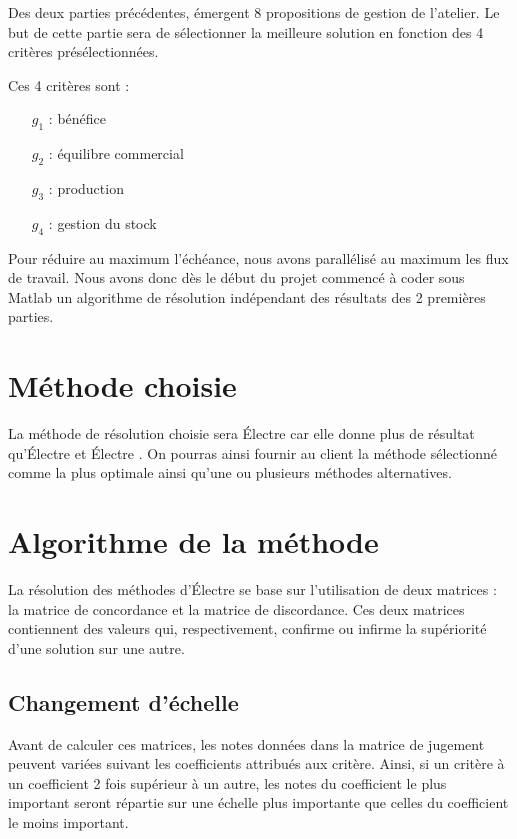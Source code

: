 
Des deux parties précédentes, émergent 8 propositions de gestion de l'atelier.
Le but de cette partie sera de sélectionner la meilleure solution en fonction des 4 critères présélectionnées.

Ces 4 critères sont :
\begin{itemize}
\item[$g_1$] : bénéfice
\item[$g_2$] : équilibre commercial
\item[$g_3$] : production
\item[$g_4$] : gestion du stock
\end{itemize}

Pour réduire au maximum l'échéance, nous avons parallélisé au maximum les flux de travail.
Nous avons donc dès le début du projet commencé à coder sous Matlab un
algorithme de résolution indépendant des résultats des 2 premières parties.

\section{Méthode choisie}

La méthode de résolution choisie sera Électre  car elle donne plus de résultat qu'Électre  et Électre .
On pourras ainsi fournir au client la méthode sélectionné comme la plus optimale ainsi qu'une ou plusieurs méthodes alternatives.

\section{Algorithme de la méthode}

La résolution des méthodes d'Électre se base sur l'utilisation de deux matrices : la matrice de concordance et la matrice de discordance.
Ces deux matrices contiennent des valeurs qui, respectivement, confirme ou infirme la supériorité d'une solution sur une autre.\\
\subsection{Changement d'échelle}
Avant de calculer ces matrices, les notes données dans la matrice de jugement peuvent variées suivant les coefficients attribués aux critère. Ainsi, si un critère à un coefficient 2 fois supérieur à un autre, les notes du coefficient le plus important seront répartie sur une échelle plus importante que celles du coefficient le moins important.

